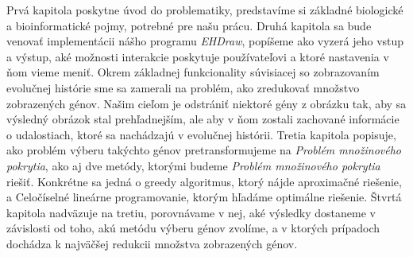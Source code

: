 Prvá kapitola poskytne úvod do problematiky, predstavíme si základné biologické a bioinformatické pojmy, potrebné pre našu prácu.
Druhá kapitola sa bude venovať implementácii nášho programu \emph{EHDraw}, popíšeme ako vyzerá jeho vstup a výstup,
aké možnosti interakcie poskytuje používateľovi a ktoré nastavenia v ňom vieme meniť.
Okrem základnej funkcionality súvisiacej so zobrazovaním evolučnej histórie sme sa zamerali na problém,
ako zredukovať množstvo zobrazených génov. Našim cieľom je odstrániť niektoré gény z obrázku tak, aby sa výsledný obrázok stal prehľadnejším, 
ale aby v ňom zostali zachované informácie o udalostiach, ktoré sa nachádzajú v evolučnej histórii.
Tretia kapitola popisuje, ako problém výberu takýchto génov pretransformujeme na \emph{Problém množinového pokrytia},
ako aj dve metódy, ktorými budeme \emph{Problém množinového pokrytia} riešiť. Konkrétne sa jedná o greedy algoritmus, ktorý nájde aproximačné riešenie,
a Celočíselné lineárne programovanie, ktorým hľadáme optimálne riešenie.
Štvrtá kapitola nadväzuje na tretiu, porovnávame v nej, aké výsledky dostaneme v závislosti od toho, akú metódu výberu génov zvolíme,
a v ktorých prípadoch dochádza k najväčšej redukcii množstva zobrazených génov. 
